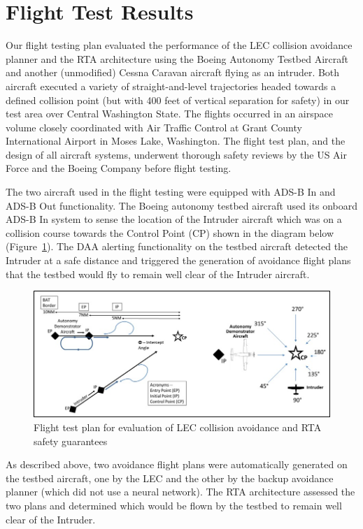 \section{Flight Test Results}

Our flight testing plan evaluated the performance of the LEC collision avoidance planner and the RTA architecture using the Boeing Autonomy Testbed Aircraft and another (unmodified) Cessna Caravan aircraft flying as an intruder.  Both aircraft executed a variety of straight-and-level trajectories headed towards a defined collision point (but with 400 feet of vertical separation for safety) in our test area over Central Washington State.  The flights occurred in an airspace volume closely coordinated with Air Traffic Control at Grant County International Airport in Moses Lake, Washington.  The flight test plan, and the design of all aircraft systems, underwent thorough safety reviews by the US Air Force and the Boeing Company before flight testing.

The two aircraft used in the flight testing were equipped with ADS-B In and ADS-B Out functionality.  The Boeing autonomy testbed aircraft used its onboard ADS-B In system to sense the location of the Intruder aircraft which was on a collision course towards the Control Point (CP) shown in the diagram below (Figure~\ref{fig:flight-test}).  The DAA alerting functionality on the testbed aircraft detected the Intruder at a safe distance and triggered the generation of avoidance flight plans that the testbed would fly to remain well clear of the Intruder aircraft.  

\begin{figure}
	\centering
	\includegraphics[width=\textwidth]{figures/flight-test.jpg}
	\caption{Flight test plan for evaluation of LEC collision avoidance and RTA safety guarantees}
	\label{fig:flight-test}
\end{figure}

As described above, two avoidance flight plans were automatically generated on the testbed aircraft, one by the LEC and the other by the backup avoidance planner (which did not use a neural network).
The RTA architecture assessed the two plans and determined which would be flown by the testbed to remain well clear of the Intruder.

